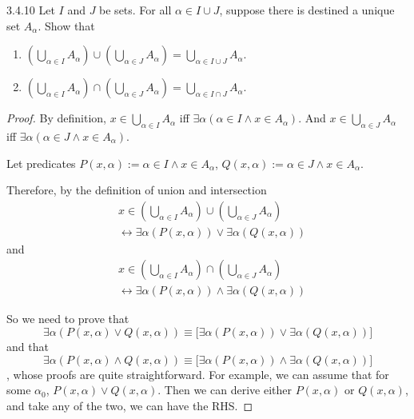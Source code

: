 \begin{exercise}{3.4.10}
	Let $I$ and $J$ be sets. For all $\alpha \in I \cup J$, suppose there is destined a unique set $A_\alpha$. Show that
	\begin{enumerate}
		\item $(\bigcup_{\alpha \in I}A_\alpha) \cup (\bigcup_{\alpha \in J}A_\alpha) = \bigcup_{\alpha \in I \cup J}A_\alpha$.
		\item $(\bigcup_{\alpha \in I}A_\alpha) \cap (\bigcup_{\alpha \in J}A_\alpha) = \bigcup_{\alpha \in I \cap J}A_\alpha$.
	\end{enumerate}
\end{exercise}
\begin{proof}
	By definition, $x \in \bigcup_{\alpha \in I}A_\alpha$ iff $\exists \alpha(\alpha \in I \wedge x \in A_\alpha)$. And $x \in \bigcup_{\alpha \in J}A_\alpha$ iff $\exists \alpha(\alpha \in J \wedge x \in A_\alpha)$.
	
	Let predicates $P(x,\alpha) := \alpha \in I \wedge x \in A_\alpha$, $Q(x,\alpha) := \alpha \in J \wedge x \in A_\alpha$.
	
	Therefore, by the definition of union and intersection
	\begin{align*}
		&x \in (\bigcup_{\alpha \in I}A_\alpha) \cup (\bigcup_{\alpha \in J}A_\alpha) \\
		&\leftrightarrow \exists \alpha(P(x,\alpha)) \vee \exists \alpha(Q(x,\alpha))
	\end{align*}
	and
	\begin{align*}
		&x \in (\bigcup_{\alpha \in I}A_\alpha) \cap (\bigcup_{\alpha \in J}A_\alpha) \\
		&\leftrightarrow \exists \alpha(P(x,\alpha)) \wedge \exists \alpha(Q(x,\alpha))
	\end{align*}
	
	So we need to prove that
	\[
		 \exists\alpha(P(x,\alpha) \vee Q(x,\alpha)) \equiv \bigl[\exists \alpha(P(x,\alpha)) \vee \exists \alpha(Q(x,\alpha))\bigr]
	\]
	and that
	\[
		\exists\alpha(P(x,\alpha) \wedge Q(x,\alpha)) \equiv \bigl[\exists \alpha(P(x,\alpha)) \wedge \exists \alpha(Q(x,\alpha))\bigr]
	\]
	, whose proofs are quite straightforward. For example, we can assume that for some $\alpha_0$, $P(x,\alpha) \vee Q(x,\alpha)$. Then we can derive either $P(x,\alpha)$ or $Q(x,\alpha)$, and take any of the two, we can have the RHS.
\end{proof}


